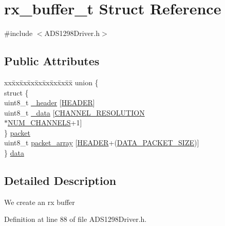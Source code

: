 \hypertarget{structrx__buffer__t}{\section{rx\-\_\-buffer\-\_\-t \-Struct \-Reference}
\label{structrx__buffer__t}
}


{\ttfamily \#include $<$\-A\-D\-S1298\-Driver.\-h$>$}

\subsection*{\-Public \-Attributes}
\begin{DoxyCompactItemize}
\item 
\begin{tabbing}
xx\=xx\=xx\=xx\=xx\=xx\=xx\=xx\=xx\=\kill
union \{\\
\>struct \{\\
\>\>uint8\_t \hyperlink{structrx__buffer__t_a779c76b344879924579b02bfd02de753}{\_header} \mbox{[}\hyperlink{_a_d_s1298_driver_8h_ab7770a7f0d95e67620ff6ed347a07a56}{HEADER}\mbox{]}\\
\>\>uint8\_t \hyperlink{structrx__buffer__t_a89b7bd9eae7429781faee54444a2824c}{\_data} \mbox{[}\hyperlink{_a_d_s1298_driver_8h_a43ebdae7ab59ca47624db7d5d2e27227}{CHANNEL\_RESOLUTION} \\
\>\>\>$\ast$\hyperlink{_a_d_s1298_driver_8h_ae5597ce31d23d11493e6e674fe257d73}{NUM\_CHANNELS}+1\mbox{]}\\
\>\} \hyperlink{structrx__buffer__t_a188d30440082b11b38ec018289ab2c66}{packet}\\
\>uint8\_t \hyperlink{structrx__buffer__t_a9dd47697370d70c9480f70f9de80809f}{packet\_array} \mbox{[}\hyperlink{_a_d_s1298_driver_8h_ab7770a7f0d95e67620ff6ed347a07a56}{HEADER}+(\hyperlink{_a_d_s1298_driver_8h_abb59a566539e5e148f63599ee6e67ea1}{DATA\_PACKET\_SIZE})\mbox{]}\\
\} \hyperlink{structrx__buffer__t_a81c8b33ce7d32d86c994e3db9c8b32c6}{data}\\

\end{tabbing}\end{DoxyCompactItemize}


\subsection{\-Detailed \-Description}
\-We create an rx buffer 

\-Definition at line 88 of file \-A\-D\-S1298\-Driver.\-h.



